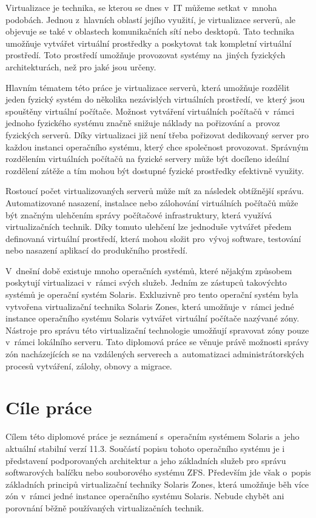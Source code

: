 \label{chapter:introduction}
Virtualizace je technika, se kterou se dnes v~IT můžeme setkat v~mnoha podobách. Jednou z~hlavních oblastí jejího využití,
je virtualizace serverů, ale objevuje se také v oblastech komunikačních sítí nebo desktopů. Tato technika umožňuje vytvářet
virtuální prostředky a poskytovat tak kompletní virtuální prostředí. Toto prostředí umožňuje provozovat systémy na~jiných
fyzických architekturách, než pro jaké jsou určeny.

Hlavním tématem této práce je virtualizace serverů, která umožňuje rozdělit jeden fyzický systém do několika nezávislých virtuálních
prostředí, ve~který jsou spouštěny virtuální počítače. Možnost vytváření virtuálních počítačů v~rámci jednoho fyzického systému
značně snižuje náklady na pořizování a~provoz fyzických serverů. Díky virtualizaci již není třeba pořizovat dedikovaný server pro
každou instanci operačního systému, který chce společnost provozovat. Správným rozdělením virtuálních počítačů na fyzické servery může být
docíleno ideální rozdělení zátěže a tím mohou být dostupné fyzické prostředky efektivně využity.

Rostoucí počet virtualizovaných serverů může mít za následek obtížnější správu. Automatizované nasazení, instalace nebo
zálohování virtuálních počítačů může být značným ulehčením správy počítačové infrastruktury, která využívá virtualizačních technik.
Díky tomuto ulehčení lze jednoduše vytvářet předem definovaná virtuální prostředí, která mohou složit pro~vývoj software, testování
nebo nasazení aplikací do produkčního prostředí. 

V~dnešní době existuje mnoho operačních systémů, které nějakým způsobem poskytují virtualizaci v~rámci svých služeb. Jedním ze zástupců
takovýchto systémů je operační systém Solaris. Exkluzivně pro tento operační systém byla vytvořena virtualizační technika Solaris
Zones, která umožňuje v~rámci jedné instance operačního systému Solaris vytvářet virtuální počítače nazývané zóny. Nástroje pro správu
této virtualizační technologie umožňují spravovat zóny pouze v~rámci lokálního serveru. Tato diplomová práce se věnuje právě možnosti
správy zón nacházejících se na vzdálených serverech a~automatizaci administrátorských procesů vytváření, zálohy, obnovy a migrace.
\section{Cíle práce}
\label{chapter:introduction:goals}
Cílem této diplomové práce je seznámení s~operačním systémem Solaris a~jeho aktuální stabilní verzí 11.3. Součástí popisu tohoto
operačního systému je i představení podporovaných architektur a jeho základních služeb pro správu softwarových balíčku nebo souborového
systému ZFS. Především jde však o~popis základních principů virtualizační techniky Solaris Zones, která umožňuje běh více zón v~rámci 
jedné instance operačního systému Solaris. Nebude chybět ani porovnání běžně používaných virtualizačních technik.

